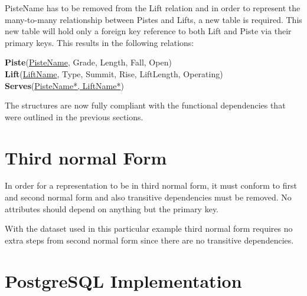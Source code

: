 \documentclass[titlepage ,12pt]{article}
\begin{document}
PisteName has to be removed from the Lift relation and in order to represent the many-to-many relationship between Pistes and Lifts, a new table is required. This new table will hold only a foreign key reference to both Lift and Piste via their primary keys. This results in the following relations: 

\textbf{Piste}(\underline{PisteName}, Grade, Length, Fall, Open) \\
\textbf{Lift}(\underline{LiftName}, Type, Summit, Rise, LiftLength, Operating) \\
\textbf{Serves}(\underline{PisteName*, LiftName*})

The structures are now fully compliant with the functional dependencies that were outlined in the previous sections.

\section{Third normal Form}
In order for a representation to be in third normal form, it must conform to first and second normal form and also transitive dependencies must be removed. No attributes should depend on anything but the primary key.

With the dataset used in this particular example third normal form requires no extra steps from second normal form since there are no transitive dependencies. 
\newpage  
\section{PostgreSQL Implementation}
\end{document}

